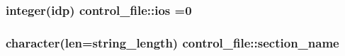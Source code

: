 \subsubsection[{\texorpdfstring{ios}{ios}}]{\setlength{\rightskip}{0pt plus 5cm}integer(idp) control\+\_\+file\+::ios =0}\hypertarget{namespacecontrol__file_a6853e365d1192ddeb155ff46b5eea846}{}\label{namespacecontrol__file_a6853e365d1192ddeb155ff46b5eea846}
\subsubsection[{\texorpdfstring{section\+\_\+name}{section_name}}]{\setlength{\rightskip}{0pt plus 5cm}character(len=string\+\_\+length) control\+\_\+file\+::section\+\_\+name}\hypertarget{namespacecontrol__file_ac0826d7eca56cce5d32c4333b55d3abb}{}\label{namespacecontrol__file_ac0826d7eca56cce5d32c4333b55d3abb}
